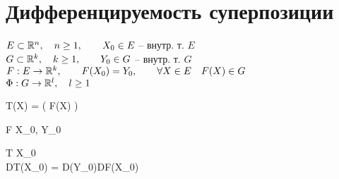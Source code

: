 \section{Дифференцируемость суперпозиции}

\begin{theorem}
	\hfill
	$ E \subset \mathbb{R}^n, \quad n \ge 1, \qquad X_0 \in E $ -- внутр. т. $ E $ \\
	$ G \subset \mathbb{R}^k, \quad k \ge 1, \qquad Y_0 \in G $ -- внутр. т. $ G $ \\
	$ F : E \to \mathbb{R}^k, \qquad F(X_0) = Y_0, \qquad \forall X \in E \quad F(X) \in G $ \\
	$ \Phi : G \to \mathbb{R}^l, \quad l \ge 1 $
	\begin{equ}{19}
		T(X) = \Phi \big( F(X) \big)
	\end{equ}
	\begin{equ}{20}
		F  X_0, \qquad \Phi {} Y_0
	\end{equ}
	\begin{mequ}[\implies \empheqlbrace]
		 T  X_0 \\
		 DT(X_0) = D\Phi(Y_0)DF(X_0)
	\end{mequ}
\end{theorem}

